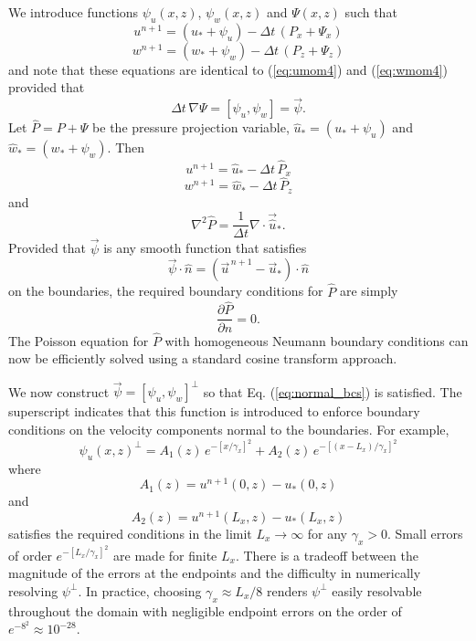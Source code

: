 \documentclass{jfm-like}
\begin{document}
 We introduce functions $\psi_u(x,z)$, $\psi_w(x,z)$ and $\Psi(x,z)$ such that
\begin{equation}
u^{n+1} = (u_*+  \psi_u) - \Delta t \, (P_x + \Psi_x)
\label{eq:umom5}
\end{equation}
\begin{equation}
w^{n+1} = (w_* + \psi_w)  - \Delta t \, ( P_z + \Psi_z)
\label{eq:wmom5}
\end{equation}
and note that these equations are identical to (\ref{eq:umom4}) and  (\ref{eq:wmom4}) provided that
\begin{equation}
\Delta t \, \nabla \Psi = [\psi_u,\psi_w] = {\vec \psi}.
\end{equation}
Let ${\hat P} = P + \Psi$ be the pressure projection variable,  ${\hat u_*} = (u_*+  \psi_u)$ and ${\hat w_*} = (w_*+  \psi_w)$. Then
\begin{equation}
u^{n+1} = {\hat u_*} - \Delta t \, {\hat P} _x
\label{eq:umom6}
\end{equation}
\begin{equation}
w^{n+1} =  {\hat w_*} - \Delta t \, {\hat P} _z
\label{eq:wmom6}
\end{equation}
and
\begin{equation}
\nabla^2 {\hat P}  = \frac{1}{\Delta t} \nabla \cdot {\vec {\hat u}}_* .
\label{eq:poisson2}
\end{equation}
Provided that ${\vec \psi}$ is any smooth function that satisfies
\begin{equation}
{\vec \psi} \cdot {\hat n} =  ( {\vec u^{\,n+1}} - {\vec u_*} ) \cdot {\hat n}
\label{eq:normal_bcs}
\end{equation}
on the boundaries, the required boundary conditions for ${\hat P}$ are simply
\begin{equation}
\frac{\partial {\hat P}}{\partial n} = 0.
\label{eq:poissonbcs2}
\end{equation}
The Poisson equation for ${\hat P}$ with homogeneous Neumann boundary conditions can now be efficiently solved using a standard cosine transform approach.

\vspace{14pt}
 We now construct ${\vec \psi} = [\psi_u,\psi_w]^{\perp}$ so that Eq. (\ref{eq:normal_bcs}) is satisfied. 
The superscript indicates that this function is introduced to enforce boundary conditions on the velocity components normal to the boundaries.
For example,
\begin{equation}
\psi_u(x,z)^{\perp} = A_1(z) \, e^{-[x/\gamma_x]^2} +  A_2(z) \, e^{-[(x-L_x)/\gamma_x]^2} 
\label{eq:ustar_normal_correction}
\end{equation}
where 
$$A_1(z) = u^{n+1}(0,z) - u_*(0,z) $$ and 
$$A_2(z) = u^{n+1}(L_x,z) - u_*(L_x,z)$$
satisfies the required conditions in the limit $L_x \to \infty$ for any $\gamma_x>0$.
Small errors of order $e^{-[L_x/\gamma_x]^2}$ are made for finite $L_x$. There is a tradeoff between
the magnitude of the errors at the endpoints and the difficulty in numerically resolving $\psi^\perp$. In practice,
choosing $\gamma_x \approx L_x/8$ renders $\psi^\perp$ easily resolvable throughout the domain with negligible endpoint errors
on the order of $e^{-8^2} \approx 10^{-28}$.
\end{document}
